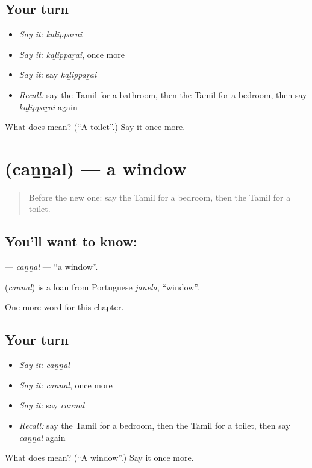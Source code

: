 \subsection*{Your turn}
\begin{itemize}
\raggedright
  \item \emph{Say it:} \emph{kaḻippaṟai}
  \item \emph{Say it:} \emph{kaḻippaṟai}, once more
  \item \emph{Say it:} say \emph{kaḻippaṟai}
  \item \emph{Recall:} say the Tamil for a bathroom, then the Tamil for a bedroom, then say \emph{kaḻippaṟai} again
\end{itemize}

\begin{tcolorbox}[breakable,colback=teal!4,colframe=teal!35!black,title={Before you move on}]
What does  mean? (\textquotedblleft{}A toilet\textquotedblright{}.) Say it once more.
\end{tcolorbox}
\section[\texorpdfstring{\ta{சன்னல்} (caṉṉal)}{சன்னல் (caṉṉal)}]{ (caṉṉal) — a window}

\label{lesson:TA-C173-cannal}



\begin{quote}
Before the new one: say the Tamil for a bedroom, then the Tamil for a toilet.
\end{quote}

\subsection*{You'll want to know: }
\textbf{} — \emph{caṉṉal} — \textquotedblleft{}a window\textquotedblright{}.

\begin{cousinweb}
\textbf{} (\emph{caṉṉal}) is a loan from Portuguese \emph{janela}, \textquotedblleft{}window\textquotedblright{}.
\end{cousinweb}

\begin{grammarlens}[title={What you've built}]
One more word for this chapter.
\end{grammarlens}

\subsection*{Your turn}
\begin{itemize}
\raggedright
  \item \emph{Say it:} \emph{caṉṉal}
  \item \emph{Say it:} \emph{caṉṉal}, once more
  \item \emph{Say it:} say \emph{caṉṉal}
  \item \emph{Recall:} say the Tamil for a bedroom, then the Tamil for a toilet, then say \emph{caṉṉal} again
\end{itemize}

\begin{tcolorbox}[breakable,colback=teal!4,colframe=teal!35!black,title={Before you move on}]
What does  mean? (\textquotedblleft{}A window\textquotedblright{}.) Say it once more.
\end{tcolorbox}
